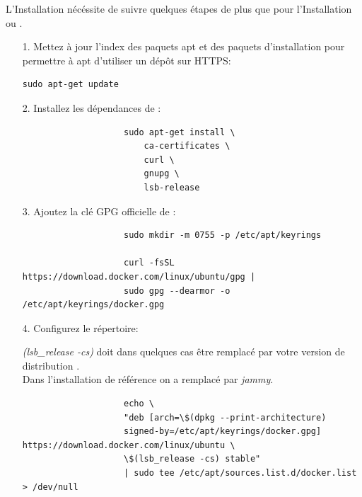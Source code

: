 \documentclass[internal]{nhitec_design}
\begin{document}
        L'Installation \linux{} nécéssite de suivre quelques étapes de plus que pour l'Installation \macos{} ou \windows{}.\\
        \begin{itemize}
     
            \item[1.] Mettez à jour l'index des paquets apt et des paquets d'installation pour permettre à apt d'utiliser un dépôt sur HTTPS:
            
                \begin{lstlisting}[style=mystyle]
                    sudo apt-get update
                \end{lstlisting}

            \item[2.] Installez les dépendances de \docker{}:

                \begin{lstlisting}
                    sudo apt-get install \
                        ca-certificates \
                        curl \
                        gnupg \
                        lsb-release
                \end{lstlisting}

            \item[3.] Ajoutez la clé GPG officielle de \docker{}:

                \begin{lstlisting}
                    sudo mkdir -m 0755 -p /etc/apt/keyrings

                    curl -fsSL https://download.docker.com/linux/ubuntu/gpg | 
                    sudo gpg --dearmor -o /etc/apt/keyrings/docker.gpg
                \end{lstlisting}

            \item[4.] Configurez le répertoire:\\

                \begin{footnotesize}
                    \textit{\textdollar(lsb\_release -cs)} doit dans quelques cas être remplacé par votre version de distribution \linux{}.\\
                    Dans l'installation de référence on a remplacé par \textit{jammy}.
                \end{footnotesize}
                \begin{lstlisting}
                    echo \
                    "deb [arch=\$(dpkg --print-architecture) 
                    signed-by=/etc/apt/keyrings/docker.gpg] https://download.docker.com/linux/ubuntu \
                    \$(lsb_release -cs) stable" 
                    | sudo tee /etc/apt/sources.list.d/docker.list > /dev/null
                \end{lstlisting}


\end{itemize}
\end{document}
